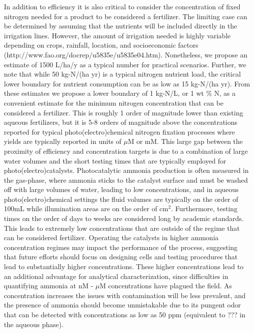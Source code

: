 In addition to efficiency it is also critical to consider the concentration of fixed nitrogen needed for a product to be considered a fertilizer. The limiting case can be determined by assuming that the nutrients will be included directly in the irrigation lines. However, the amount of irrigation needed is highly variable depending on crops, rainfall, location, and socioeconomic factors (http://www.fao.org/docrep/u5835e/u5835e04.htm). Nonetheless, we propose an estimate of 1500 L/ha/y as a typical number for practical scenarios. Further, we note that while 50 kg-N/(ha yr) is a typical nitrogen nutrient load, the critical lower boundary for nutrient consumption can be as low as 15 kg-N/(ha yr). From these estimates we propose a lower boundary of 1 kg-N/L, or 1 wt \% N, as a convenient estimate for the minimum nitrogen concentration that can be considered a fertilizer. This is roughly 1 order of magnitude lower than existing aqueous fertilizers, but it is 5-8 orders of magnitude above the concentrations reported for typical photo(electro)chemical nitrogen fixation processes where yields are typically reported in units of $\mu$M or mM. This large gap between the proximity of efficiency and concentration targets is due to a combination of large water volumes and the short testing times that are typically employed for photo(electro)catalysts. Photocatalytic ammonia production is often measured in the gas-phase, where ammonia sticks to the catalyst surface and must be washed off with large volumes of water, leading to low concentrations, and in aqueous photo(electro)chemical settings the fluid volumes are typically on the order of 100mL while illumination areas are on the order of cm$^2$. Furthermore, testing times on the order of days to weeks are considered long by academic standards. This leads to extremely low concentrations that are outside of the regime that can be considered fertilizer. Operating the catalysts in higher ammonia concentration regimes may impact the performance of the process, suggesting that future efforts should focus on designing cells and testing procedures that lead to substantially higher concentrations. These higher concentrations lead to an additional advantage for analytical characterization, since difficulties in quantifying ammonia at nM - $\mu$M concentrations have plagued the field. As concentration increases the issues with contamination will be less prevalent, and the presence of ammonia should become unmistakable due to its pungent odor that can be detected with concentrations as low as 50 ppm (equivalent to ??? in the aqueous phase).

